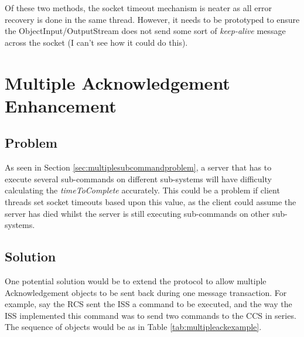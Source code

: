 \documentclass[10pt,a4paper]{article}
\begin{document}
Of these two methods, the socket timeout mechanism is neater as all error recovery is done in the same thread.
However, it needs to be prototyped to ensure the ObjectInput/OutputStream does not send some sort of {\em keep-alive}
message across the socket (I can't see how it could do this). 

\section{Multiple Acknowledgement Enhancement}
\label{sec:multipleack}
\subsection{Problem}
As seen in Section \ref{sec:multiplesubcommandproblem}, a server that has to execute several sub-commands on
different sub-systems will have difficulty calculating the {\em timeToComplete} accurately. This could be a problem
if client threads set socket timeouts based upon this value, as the client could assume the server has died
whilst the server is still executing sub-commands on other sub-systems. 

\subsection{Solution}
One potential solution would be to extend the protocol to allow multiple Acknowledgement objects to be sent
back during one message transaction. For example, say the RCS sent the ISS a command to be executed, and the
way the ISS implemented this command was to send two commands to the CCS in series. The sequence of objects
would be as in Table \ref{tab:multipleackexample}.
\end{document}
